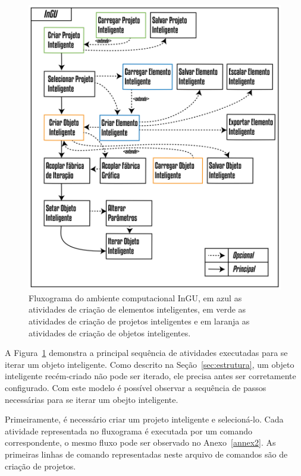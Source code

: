 \documentclass[a4paper,12pt]{monografia}
\theoremstyle{plain}
\theoremstyle{definition}
\theoremstyle{remark}
\begin{document}
\begin{figure}[!htbp]
	\centering
	\includegraphics[width=\linewidth]{Figures/CasoDeUso@16x.png}
	\caption{Fluxograma do ambiente computacional InGU, em azul as atividades de criação de elementos inteligentes, em verde as atividades de criação de projetos inteligentes e em laranja as atividades de criação de objetos inteligentes.}
	\label{fig:caso_uso}
\end{figure}

A Figura~\ref{fig:caso_uso} demonstra a principal sequência de atividades executadas para se iterar um objeto inteligente. Como descrito na Seção~\ref{sec:estrutura}, um objeto inteligente recém-criado não pode ser iterado, ele precisa antes ser corretamente configurado. Com este modelo é possível observar a sequência de passos necessárias para se iterar um obejto inteligente.

Primeiramente, é necessário criar um projeto inteligente e selecioná-lo. Cada atividade representada no fluxograma é executada por um comando correspondente, o mesmo fluxo pode ser observado no Anexo~\ref{annex2}. As primeiras linhas de comando representadas neste arquivo de comandos são de criação de projetos.
\end{document}
